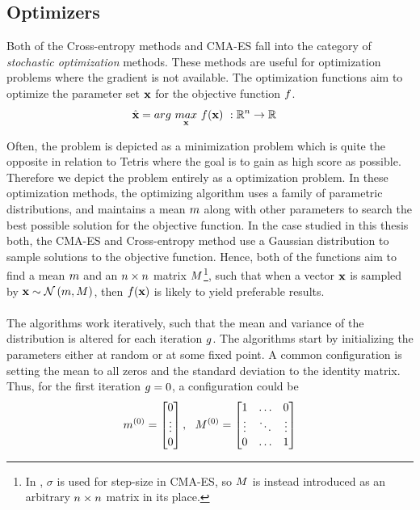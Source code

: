 \subsection{Optimizers \label{Optimizers}}

Both of the Cross-entropy methods and CMA-ES fall into the category of 
\textit{stochastic optimization}
methods. These methods are useful for 
optimization problems where the gradient is not available.
The optimization functions aim to optimize 
the parameter set $\textbf{x}$
for the objective function $f$.
\begin{align}
\hat{\textbf{\individual }} &= 
arg \  \underset{\textbf{\individual }}{max} \  
\fitnessFunction (\textbf{\individual }) \ 
:\mathbb{R}^{\dimensions } \rightarrow \mathbb{R}
\end{align}

Often, the problem is depicted as a minimization problem which is quite
the opposite in relation to Tetris where the goal is to gain as high score as possible.
Therefore we depict the problem entirely as a optimization problem.
In these optimization methods, the optimizing algorithm uses a family of parametric distributions,
and maintains a mean $m $ along with other parameters
to search the best possible solution for the objective function.  
In the case studied in this thesis
both, the CMA-ES and Cross-entropy method use a 
Gaussian distribution to sample solutions to the objective function.
Hence, both of the functions aim to find a mean 
$m $ and an $n \times n$ matrix 
$M $\footnote{In \citep{hansen2011}, 
$\sigma$ is used for step-size in CMA-ES, so $M $ is instead introduced
as an arbitrary $n \times n$ matrix in its place.}, such that when
a vector $\textbf{x}$ is sampled by 
$\textbf{x} \sim \mathcal{N}\left( m, M \right)$, 
then $f (\textbf{x})$ 
is likely to yield preferable results.\\
\\
The algorithms work iteratively, such that the mean and variance 
of the distribution 
is altered for each iteration $g $.
The algorithms start by initializing the 
parameters either at random or at some fixed point. A common 
configuration is setting the mean to 
all zeros and the standard deviation to the identity matrix.
Thus, for the first iteration $g = 0$, a configuration could be
\begin{align}
\mean^{(0)} =
\begin{bmatrix}
0\\
\vdots\\
0
\end{bmatrix},\ \ 
\varianceMatrix^{(0)} = 
\begin{bmatrix}
1 & \hdots & 0\\
\vdots & \ddots & \vdots\\
0 & \hdots & 1
\end{bmatrix}
\end{align}

